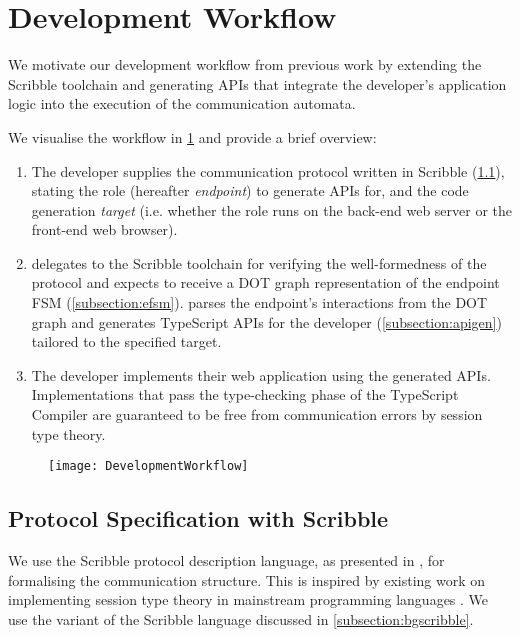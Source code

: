 \section{Development Workflow}

We motivate our development workflow from previous work 
\cite{PureScript2019, Hybrid2016, LinearDecomp} 
by extending the Scribble toolchain
and generating APIs that integrate the developer's 
application logic
into the execution of the communication automata.

We visualise the workflow in \cref{fig:devworkflow} 
and provide a brief overview:

\begin{enumerate}

\item The developer supplies the communication protocol written in
Scribble (\cref{subsection:scribble}), 
stating the role (hereafter \textit{endpoint})
to generate APIs for,
and the code generation \textit{target}
(i.e. whether the role runs on the back-end web server or 
the front-end web browser).

\item \codegen delegates to the 
Scribble toolchain for verifying the well-formedness of
the protocol and expects to receive a DOT graph representation of
the endpoint FSM (\cref{subsection:efsm}). 
\codegen parses the endpoint's 
interactions from the DOT graph and generates TypeScript APIs
for the developer (\cref{subsection:apigen}) 
tailored to the specified target.

\item The developer implements their web application using the
generated APIs. Implementations that pass the type-checking phase
of the TypeScript Compiler are guaranteed to be free from 
communication errors by session type theory.

\end{enumerate}

\begin{figure}[!ht]
\centering
\texttt{[image: DevelopmentWorkflow]}
\label{fig:devworkflow}
\end{figure}

\subsection{Protocol Specification with Scribble}
\label{subsection:scribble}

We use the Scribble protocol description language, 
as presented in
\cite{Scribble}, for formalising the communication structure. This is
inspired by existing work on implementing session type theory 
in mainstream programming languages
\cite{Hybrid2016, PureScript2019, Python2017, LinearDecomp}. 
We use the variant of the Scribble language 
discussed in \cref{subsection:bgscribble}.


